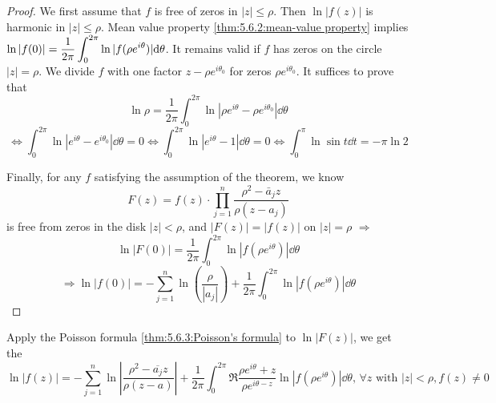 \begin{proof}
    We first assume that  $ f  $ is free of zeros in  $ |z| \leq \rho $. Then  $ \ln |f(z)|  $ is harmonic in  $ |z| \leq \rho $. Mean value property \ref{thm:5.6.2:mean-value property} implies  $ \ln|f(0)|=\displaystyle\frac{1}{2\pi }\int_0^{2\pi} \ln |f(\rho e^{i\theta})| \mathrm{d}\theta $. It remains valid if  $  f  $ has zeros on the circle  $ |z|=\rho $. We divide  $ f  $ with one factor  $ z-\rho e^{i\theta_0} $ for zeros  $ \rho e^{i\theta_0} $. It suffices to prove that 
    \[\ln \rho=\frac{1}{2\pi}\int_0^{2\pi}\ln|\rho e^{i\theta}-\rho e^{i\theta_0}|\dd\theta\]
    \[\Leftrightarrow\int_0^{2\pi}\ln|e^{i\theta}-e^{i\theta_0}|\dd\theta=0\Leftrightarrow\int_0^{2\pi}\ln|e^{i\theta}-1|\dd\theta=0\Leftrightarrow\int_0^{\pi}\ln\sin t\dd t=-\pi \ln 2\]
    
    Finally, for any  $ f  $ satisfying the assumption of the theorem, we know 
    \begin{equation}
        F(z)=f(z)\cdot\prod_{j=1}^n\frac{\rho^2-\bar{a}_jz}{\rho(z-a_j)}
    \end{equation}
    is free from zeros in the disk  $ |z|<\rho $, and  $ |F(z)|=|f(z)|  $ on  $ |z|=\rho $ $ \Rightarrow $
    \[\ln|F(0)|=\frac{1}{2\pi}\int_0^{2\pi}\ln|f(\rho e^{i\theta})|\dd\theta\]
    \[\Rightarrow \ln|f(0)|=-\sum_{j=1}^n\ln\left(\frac{\rho}{|a_j|}\right)+\frac{1}{2\pi}\int_0^{2\pi}\ln|f(\rho e^{i\theta})|\dd\theta\]  
\end{proof}
\begin{remark}
    Apply the Poisson formula \ref{thm:5.6.3:Poisson's formula} to  $ \ln|F(z)| $, we get the  
    \begin{equation}\label{eq:5.3.1:Poisson-Jensen formula}
        \ln|f(z)|=-\sum_{j=1}^n\ln\left|\frac{\rho^2-\overline{a_j}z}{\rho(z-a)}\right|+\frac{1}{2\pi}\int_0^{2\pi}\Re\frac{\rho e^{i\theta}+z}{\rho e^{i\theta-z}}\ln|f(\rho e^{i\theta})|\dd\theta,\,\forall z\text{ with }|z|<\rho,f(z)\neq 0
    \end{equation}
\end{remark}
